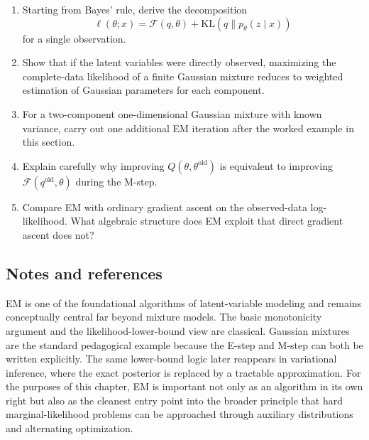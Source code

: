 \begin{enumerate}
    \item Starting from Bayes' rule, derive the decomposition
    \[
    \ell(\theta;x)=\mathcal{F}(q,\theta)+\mathrm{KL}(q\|p_\theta(z\mid x))
    \]
    for a single observation.
    \item Show that if the latent variables were directly observed, maximizing the complete-data likelihood of a finite Gaussian mixture reduces to weighted estimation of Gaussian parameters for each component.
    \item For a two-component one-dimensional Gaussian mixture with known variance, carry out one additional EM iteration after the worked example in this section.
    \item Explain carefully why improving $Q(\theta,\theta^{\mathrm{old}})$ is equivalent to improving $\mathcal{F}(q^{\mathrm{old}},\theta)$ during the M-step.
    \item Compare EM with ordinary gradient ascent on the observed-data log-likelihood. What algebraic structure does EM exploit that direct gradient ascent does not?
\end{enumerate}

\subsection*{Notes and references}

EM is one of the foundational algorithms of latent-variable modeling and remains conceptually central far beyond mixture models.
The basic monotonicity argument and the likelihood-lower-bound view are classical.
Gaussian mixtures are the standard pedagogical example because the E-step and M-step can both be written explicitly.
The same lower-bound logic later reappears in variational inference, where the exact posterior is replaced by a tractable approximation.
For the purposes of this chapter, EM is important not only as an algorithm in its own right but also as the cleanest entry point into the broader principle that hard marginal-likelihood problems can be approached through auxiliary distributions and alternating optimization.
